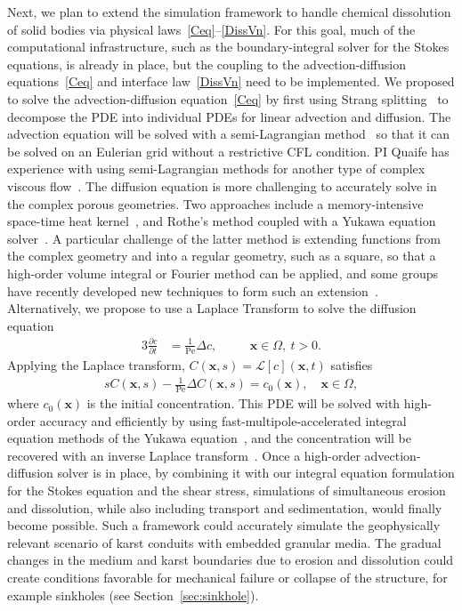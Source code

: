 \documentclass[11pt]{article}
\newcommand{\pd}[2]{ \frac{ \partial #1}{ \partial #2 } }
\newcommand{\bvec}[1]{{\mathbf{#1}}}
\newcommand{\Pe}{\mathrm{Pe}}
\newcommand{\xx}{\bvec{x}}
\begin{document}
Next, we plan to extend the simulation framework to handle chemical dissolution of solid bodies via physical laws~\eqref{Ceq}--\eqref{DissVn}. For this goal, much of the computational infrastructure, such as the boundary-integral solver for the Stokes equations, is already in place, but the coupling to the advection-diffusion equations~\eqref{Ceq} and interface law~\eqref{DissVn} need to be implemented.  We proposed to solve the advection-diffusion equation~\eqref{Ceq} by first using Strang splitting~\cite{str1968} to decompose the PDE into individual PDEs for linear advection and diffusion.  The advection equation will be solved with a semi-Lagrangian method~\cite{rob1981} so that it can be solved on an Eulerian grid without a restrictive CFL condition. PI Quaife has experience with using semi-Lagrangian methods for another type of complex viscous flow~\cite{kab-qua-bir2017}.  The diffusion equation is more challenging to accurately solve in the complex porous geometries.  Two approaches include a memory-intensive space-time heat kernel~\cite{bar-eps-gre-jia-wan2019, jia-gre-wan2015, li-gre2009}, and Rothe's method coupled with a Yukawa equation solver~\cite{kro-qua2010, cau-cho-chr-sea2016}. A particular challenge of the latter method is extending functions from the complex geometry and into a regular geometry, such as a square, so that a high-order volume integral or Fourier method can be applied, and some groups have recently developed new techniques to form such an extension~\cite{fry-kro-tor2019, fry-leh-tor2019}. Alternatively, we propose to use a Laplace Transform to solve the diffusion equation
\begin{alignat}{3}
  \pd{c}{t} &= \frac{1}{\Pe} \Delta c, \quad &&\xx \in \Omega, \: t>0.
\end{alignat}
Applying the Laplace transform, $C(\xx,s) = \mathcal{L}[c](\xx,t)$ satisfies
\begin{align}
  sC(\xx,s) - \frac{1}{\Pe}\Delta C(\xx,s) = c_0(\xx), 
    \quad \xx \in \Omega,
  \label{eqn:DiffusionLaplace}
\end{align}
where $c_0(\xx)$ is the initial concentration. This PDE will be solved with high-order accuracy and efficiently by using fast-multipole-accelerated integral equation methods of the Yukawa equation~\cite{kro-qua2011}, and the concentration will be recovered with an inverse Laplace transform~\cite{jos-war2006}. Once a high-order advection-diffusion solver is in place, by combining it with our integral equation formulation for the Stokes equation and the shear stress, simulations of simultaneous erosion and dissolution, while also including transport and sedimentation, would finally become possible.  Such a framework could accurately simulate the geophysically relevant scenario of karst conduits with embedded granular media. The gradual changes in the medium and karst boundaries due to erosion and dissolution could create conditions favorable for mechanical failure or collapse of the structure, for example sinkholes (see Section~\ref{sec:sinkhole}).  
\end{document}
